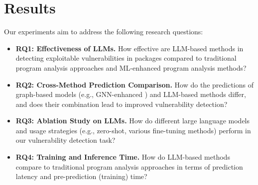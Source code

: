 \documentclass[12pt,openany,oneside,table]{cmuthesis}
\begin{document}
\section{Results}
\label{sec:results}
Our experiments aim to address the following research questions:
\begin{itemize}[left=0pt, label={}]
    \setlength{\itemsep}{0pt}
    \item \textbf{RQ1: Effectiveness of LLMs.} How effective are LLM-based methods in detecting exploitable vulnerabilities in \nodejs packages compared to traditional program analysis approaches and ML-enhanced program analysis methods?
    \item \textbf{RQ2: Cross-Method Prediction Comparison.} How do the predictions of graph-based models (e.g., GNN-enhanced \nodemedicfine) and LLM-based methods differ, and does their combination lead to improved vulnerability detection?
    \item \textbf{RQ3: Ablation Study on LLMs.} How do different large language models and usage strategies (e.g., zero-shot, various fine-tuning methods) perform in our vulnerability detection task?
    \item \textbf{RQ4: Training and Inference Time.} How do LLM-based methods compare to traditional program analysis approaches in terms of prediction latency and pre-prediction (training) time?
    
\end{itemize}
\end{document}
